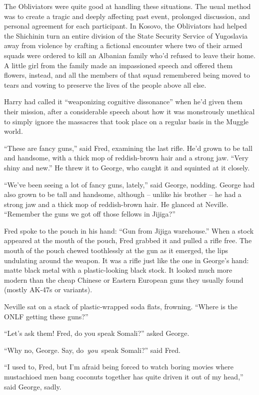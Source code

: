 The Obliviators were quite good at handling these situations. The usual
method was to create a tragic and deeply affecting past event, prolonged
discussion, and personal agreement for each participant. In Kosovo, the
Obliviators had helped the Shichinin turn an entire division of the
State Security Service of Yugoslavia away from violence by crafting a
fictional encounter where two of their armed squads were ordered to kill
an Albanian family who'd refused to leave their home. A little girl from
the family made an impassioned speech and offered them flowers, instead,
and all the members of that squad remembered being moved to tears and
vowing to preserve the lives of the people above all else.

Harry had called it ``weaponizing cognitive dissonance'' when he'd given
them their mission, after a considerable speech about how it was
monstrously unethical to simply ignore the massacres that took place on
a regular basis in the Muggle world.

``These are fancy guns,'' said Fred, examining the last rifle. He'd
grown to be tall and handsome, with a thick mop of reddish-brown hair
and a strong jaw. ``Very shiny and new.'' He threw it to George, who
caught it and squinted at it closely.

``We've been seeing a lot of fancy guns, lately,'' said George, nodding.
George had also grown to be tall and handsome, although -- unlike his
brother -- he had a strong jaw and a thick mop of reddish-brown hair. He
glanced at Neville. ``Remember the guns we got off those fellows in
Jijiga?''

Fred spoke to the pouch in his hand: ``Gun from Jijiga warehouse.'' When
a stock appeared at the mouth of the pouch, Fred grabbed it and pulled a
rifle free. The mouth of the pouch chewed toothlessly at the gun as it
emerged, the lips undulating around the weapon. It was a rifle just like
the one in George's hand: matte black metal with a plastic-looking black
stock. It looked much more modern than the cheap Chinese or Eastern
European guns they usually found (mostly AK-47s or variants).

Neville sat on a stack of plastic-wrapped soda flats, frowning. ``Where
is the ONLF getting these guns?''

``Let's ask them! Fred, do you speak Somali?'' asked George.

``Why no, George. Say, do~\emph{you}~speak Somali?'' said Fred.

``I used to, Fred, but I'm afraid being forced to watch boring movies
where mustachioed men bang coconuts together has quite driven it out of
my head,'' said George, sadly.

